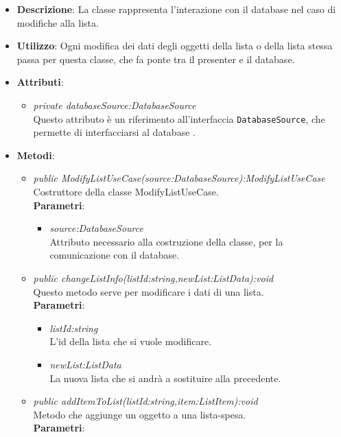 \begin{itemize}
\item \textbf{Descrizione}: La classe rappresenta l'interazione con il database nel caso di modifiche alla lista.
\item \textbf{Utilizzo}: Ogni modifica dei dati degli oggetti della lista o della lista stessa passa per questa classe, che fa ponte tra il presenter e il database.
\item \textbf{Attributi}: 
	\begin{itemize}
	\item \textit{private databaseSource:DatabaseSource}\\
	Questo attributo è un riferimento all'interfaccia \texttt{DatabaseSource}, che permette di interfacciarsi al database .
	\end{itemize}
\item \textbf{Metodi}:
	\begin{itemize}
	\item \textit{public ModifyListUseCase(source:DatabaseSource):ModifyListUseCase}\\
	Costruttore della classe ModifyListUseCase.
			\\ \textbf{Parametri}: \begin{itemize}
			\item \textit{source:DatabaseSource}\\
			Attributo necessario alla costruzione della classe, per la comunicazione con  il database.
			\end{itemize} 
	\item \textit{public changeListInfo(listId:string,newList:ListData):void}\\
	Questo metodo serve per modificare i dati di una lista.
			\\ \textbf{Parametri}: \begin{itemize}
			\item \textit{listId:string}\\
			L'id della lista che si vuole modificare.
			\item \textit{newList:ListData}\\
			La nuova lista che si andrà a sostituire alla precedente.
			\end{itemize} 
	\item \textit{public addItemToList(listId:string,item:ListItem):void}\\
	Metodo che aggiunge un oggetto a una lista-spesa.
			\\ \textbf{Parametri}: \begin{itemize}

\end{itemize}
\end{itemize}
\end{itemize}
